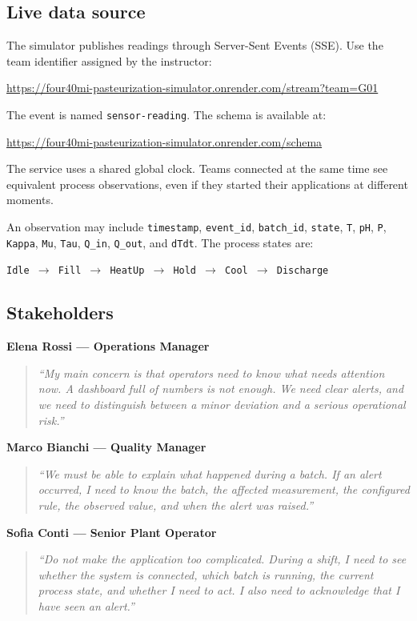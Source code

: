\documentclass[11pt,a4paper]{article}
\newcommand{\quoteitem}[1]{\begin{quote}\itshape #1\end{quote}}
\begin{document}
\subsection{Live data source}
The simulator publishes readings through Server-Sent Events (SSE). Use the team identifier assigned by the instructor:

\begin{center}\url{https://four40mi-pasteurization-simulator.onrender.com/stream?team=G01}\end{center}

The event is named \texttt{sensor-reading}. The schema is available at:

\begin{center}\url{https://four40mi-pasteurization-simulator.onrender.com/schema}\end{center}

The service uses a shared global clock. Teams connected at the same time see equivalent process observations, even if they started their applications at different moments.

An observation may include \texttt{timestamp}, \texttt{event\_id}, \texttt{batch\_id}, \texttt{state}, \texttt{T}, \texttt{pH}, \texttt{P}, \texttt{Kappa}, \texttt{Mu}, \texttt{Tau}, \texttt{Q\_in}, \texttt{Q\_out}, and \texttt{dTdt}. The process states are:

\begin{center}\texttt{Idle $\rightarrow$ Fill $\rightarrow$ HeatUp $\rightarrow$ Hold $\rightarrow$ Cool $\rightarrow$ Discharge}\end{center}

\subsection{Stakeholders}
\textbf{Elena Rossi --- Operations Manager}
\quoteitem{``My main concern is that operators need to know what needs attention now. A dashboard full of numbers is not enough. We need clear alerts, and we need to distinguish between a minor deviation and a serious operational risk.''}

\textbf{Marco Bianchi --- Quality Manager}
\quoteitem{``We must be able to explain what happened during a batch. If an alert occurred, I need to know the batch, the affected measurement, the configured rule, the observed value, and when the alert was raised.''}

\textbf{Sofia Conti --- Senior Plant Operator}
\quoteitem{``Do not make the application too complicated. During a shift, I need to see whether the system is connected, which batch is running, the current process state, and whether I need to act. I also need to acknowledge that I have seen an alert.''}
\end{document}
